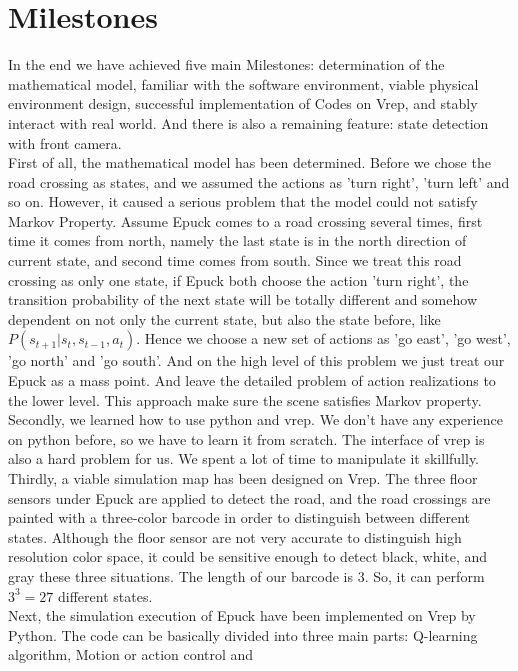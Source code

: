 \documentclass[a4paper, 11pt]{article} %
\begin{document}
\section{Milestones}
In the end we have achieved five main Milestones: determination of the mathematical
model, familiar with the software environment, viable physical environment design,
successful implementation of Codes on Vrep, and stably interact with real world.
And there is also a remaining feature: state detection with front camera.
\\[3ex]
First of all, the mathematical model has been determined. Before we
chose the road crossing as states, and we assumed the actions as 'turn right',
'turn left' and so on. However, it caused a serious problem that the model
could not satisfy Markov Property. Assume Epuck comes to a road crossing
several times, first time it comes from north, namely the last state is in the
north direction of current state, and second time comes from south. Since
we treat this road crossing as only one state, if Epuck both choose the action
'turn right', the transition probability of the next state will be totally different
and somehow dependent on not only the current state, but also the state
before, like $P(s_{t+1}|s_t, s_{t-1}, a_t)$. Hence we choose a new set of actions
as 'go east', 'go west', 'go north' and 'go south'. And on the high level of
this problem we just treat our Epuck as a mass point. And leave the detailed
problem of action realizations to the lower level. This approach make sure the
scene satisfies Markov property.
\\[3ex]
Secondly, we learned how to use python and vrep. We don't have any experience on
python before, so we have to learn it from scratch. The interface of vrep is also
a hard problem for us. We spent a lot of time to manipulate it skillfully.
\\[3ex]
Thirdly, a viable simulation map has been designed on Vrep. The
three floor sensors under Epuck are applied to detect the road, and the
road crossings are painted with a three-color barcode in order to distinguish
between different states. Although the floor sensor are not very accurate to
distinguish high resolution color space, it could be sensitive enough to detect
black, white, and gray these three situations. The length of our barcode is 3.
So, it can perform $3^3 = 27$ different states.
\\[3ex]
Next, the simulation execution of Epuck have
been implemented on Vrep by Python. The code can be basically divided
into three main parts: Q-learning algorithm, Motion or action control and
\end{document}
